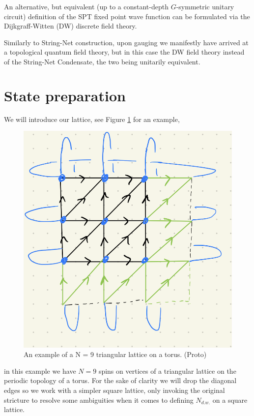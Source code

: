 \documentclass[a4paper,twocolumn,11pt]{quantumarticle}
\begin{document}
An alternative, but equivalent (up to a  constant-depth $G$-symmetric unitary circuit) definition of the SPT fixed point wave function can be formulated via the Dijkgraff-Witten (DW) discrete field theory.

Similarly to String-Net construction, upon gauging we manifestly have arrived at a topological quantum field theory, but in this case the DW field theory instead of the String-Net Condensate, the two being unitarily equivalent.	


\section{State preparation}

We will introduce our lattice, see Figure \ref{fig:3x3pbc} for an example,
\begin{figure}
\centering
\includegraphics[width=\linewidth]{Figures/3x3_pbc.png}
\caption{An example of a N = 9 triangular lattice on a torus. (Proto)}
\label{fig:3x3pbc}
\end{figure}
in this example we have $N = 9$ spins on vertices of a triangular lattice on the periodic topology of a torus. For the sake of clarity we will drop the diagonal edges so we work with a simpler square lattice, only invoking the original stricture to resolve some ambiguities when it comes to defining $N_{d.w.}$ on a square lattice.
\end{document}

